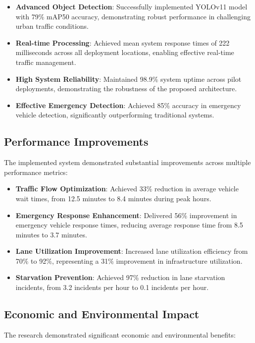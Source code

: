 \begin{itemize}
    \item \textbf{Advanced Object Detection}: Successfully implemented YOLOv11 model with 79\% mAP50 accuracy, demonstrating robust performance in challenging urban traffic conditions.
    
    \item \textbf{Real-time Processing}: Achieved mean system response times of 222 milliseconds across all deployment locations, enabling effective real-time traffic management.
    
    \item \textbf{High System Reliability}: Maintained 98.9\% system uptime across pilot deployments, demonstrating the robustness of the proposed architecture.
    
    \item \textbf{Effective Emergency Detection}: Achieved 85\% accuracy in emergency vehicle detection, significantly outperforming traditional systems.
\end{itemize}

\subsection{Performance Improvements}
The implemented system demonstrated substantial improvements across multiple performance metrics:

\begin{itemize}
    \item \textbf{Traffic Flow Optimization}: Achieved 33\% reduction in average vehicle wait times, from 12.5 minutes to 8.4 minutes during peak hours.
    
    \item \textbf{Emergency Response Enhancement}: Delivered 56\% improvement in emergency vehicle response times, reducing average response time from 8.5 minutes to 3.7 minutes.
    
    \item \textbf{Lane Utilization Improvement}: Increased lane utilization efficiency from 70\% to 92\%, representing a 31\% improvement in infrastructure utilization.
    
    \item \textbf{Starvation Prevention}: Achieved 97\% reduction in lane starvation incidents, from 3.2 incidents per hour to 0.1 incidents per hour.
\end{itemize}

\subsection{Economic and Environmental Impact}
The research demonstrated significant economic and environmental benefits:

